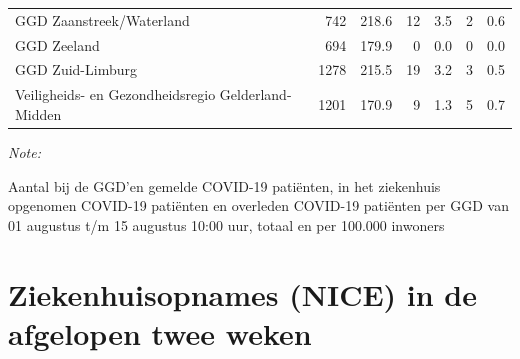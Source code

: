 \documentclass[
  english,
  man,floatsintext]{apa6}
\begin{document}
\begin{table}
\begin{threeparttable}
\begin{tabular}{lrrrrrr}
GGD Zaanstreek/Waterland & 742 & 218.6 & 12 & 3.5 & 2 & 0.6\\
GGD Zeeland & 694 & 179.9 & 0 & 0.0 & 0 & 0.0\\
GGD Zuid-Limburg & 1278 & 215.5 & 19 & 3.2 & 3 & 0.5\\
Veiligheids- en Gezondheidsregio Gelderland-Midden & 1201 & 170.9 & 9 & 1.3 & 5 & 0.7\\
\bottomrule
\end{tabular}
\begin{tablenotes}
\item \textit{Note: } 
\item Aantal bij de GGD’en gemelde COVID-19 patiënten, in het ziekenhuis opgenomen COVID-19 patiënten en overleden COVID-19 patiënten per GGD van 01 augustus t/m 15 augustus 10:00 uur, totaal en per 100.000 inwoners
\end{tablenotes}
\end{threeparttable}
\endgroup{}
\end{table}

\newpage

\hypertarget{ziekenhuisopnames-nice-in-de-afgelopen-twee-weken}{%
\section{Ziekenhuisopnames (NICE) in de afgelopen twee weken}\label{ziekenhuisopnames-nice-in-de-afgelopen-twee-weken}}
\end{document}
